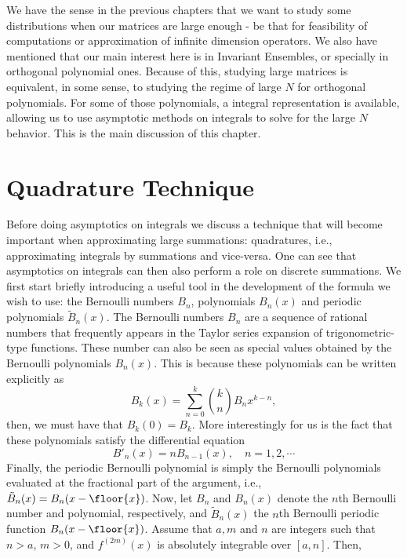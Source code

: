 We have the sense in the previous chapters that we want to study some distributions when our matrices are large enough - be that for feasibility of computations or approximation of infinite dimension operators. We also have mentioned that our main interest here is in Invariant Ensembles, or specially in orthogonal polynomial ones. Because of this, studying large matrices is equivalent, in some sense, to studying the regime of large $N$ for orthogonal polynomials. For some of those polynomials, a integral representation is available, allowing us to use asymptotic methods on integrals to solve for the large $N$ behavior. This is the main discussion of this chapter.

\section{Quadrature Technique}

Before doing asymptotics on integrals we discuss a technique that will become important when approximating large summations: quadratures, i.e., approximating integrals by summations and vice-versa. One can see that asymptotics on integrals can then also perform a role on discrete summations. We first start briefly introducing a useful tool in the development of the formula we wish to use: the Bernoulli numbers $B_n$, polynomials $B_n(x)$ and periodic polynomials $\tilde{B}_n(x)$. The Bernoulli numbers $B_n$ are a sequence of rational numbers that frequently appears in the Taylor series expansion of trigonometric-type functions. These number can also be seen as special values obtained by the Bernoulli polynomials $B_n(x)$. This is because these polynomials can be written explicitly as
\begin{equation}
	B_k(x) = \sum_{n=0}^{k} {k \choose n} B_n x^{k-n},
\end{equation}
then, we must have that $B_k(0) = B_k$. More interestingly for us is the fact that these polynomials satisfy the differential equation 
\begin{equation}
	B'_n(x) = n B_{n-1}(x), \quad n = 1,2,\cdots
	\label{Equation: Differential Bernoulli}
\end{equation}
Finally, the periodic Bernoulli polynomial is simply the Bernoulli polynomials evaluated at the fractional part of the argument, i.e., $\tilde{B}_n(x) = B_n(x - \floor{x})$. Now, let $B_n$ and $B_n(x)$ denote the $n$th Bernoulli number and polynomial, respectively, and $\tilde{B}_n(x)$ the $n$th Bernoulli periodic function $B_n(x - \floor{x})$. Assume that $a, m$ and $n$ are integers such that $n > a$, $m > 0$, and $f^{(2m)}(x)$ is absolutely integrable over $[a,n]$. Then, 

